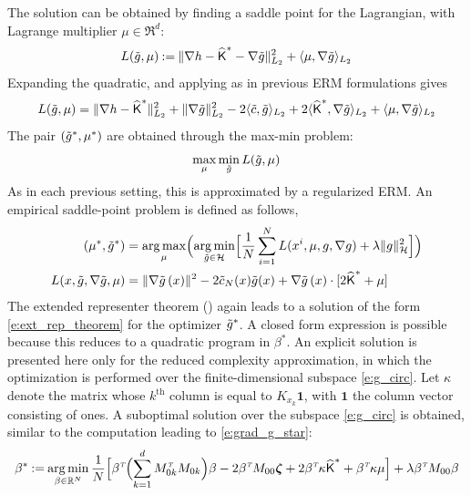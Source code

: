 The solution can be obtained by finding a saddle point for the Lagrangian,  with Lagrange multiplier $\mu  \in\Re^d$:
\begin{equation}
L(\tilg, \mu ) \eqdef   \| \nabla h - \hakFPF^* - \nabla \tilg \|^2_{L_2} +  \langle \mu ,  \nabla \tilg \rangle_{L_2}
\label{e:lag_dual}
\end{equation}
Expanding the quadratic, and applying  as in previous ERM formulations gives
\begin{equation}
L(\tilde g, \mu ) = \| \nabla h - \widehat{\text{\sf K}}^*\|_{L_2}^2 + \|\nabla \tilde g\|_{L_2}^2 - 2 \langle \tilde c, \tilde g \rangle_{L_2} + 2 \langle \widehat{\text{\sf K}}^*, \nabla \tilde g \rangle_{L_2} +  \langle \mu ,  \nabla \tilde g \rangle_{L_2}
\end{equation}
The pair $(\tilde g^*,\mu^*) $ are obtained through the max-min problem:
\begin{equation}
\max_\mu \min_{\tilde g}
L(\tilde g, \mu )
\end{equation}
As in each previous setting, this is approximated by a regularized ERM.
An empirical saddle-point problem is defined as follows,
\begin{equation}
\begin{aligned}
(\mu^* ,  \tilde g^*)  & =
\mathop{\rm arg{\,}max}_\mu  \Bigl(\mathop{\rm arg{\,}min}_{\tilde g \in {\cal H}} \Bigl[ \frac{1}{N} \sum_{i=1}^N  L(x^i,\mu, g,\nabla g) + \lambda \|g\|^2_{\cal H} \Bigr] \Bigr) \\
L(x,\tilde g,\nabla \tilde g, \mu)
&= \|\nabla \tilde g\, (x) \|^2    - 2   \tilde c_N(x)   \tilde g (x) +     \nabla \tilde g \, (x) \cdot [2 \widehat{\text{\sf K}}^*   + \mu]
\end{aligned}
\end{equation}
The extended representer theorem () again leads to a solution of the form \eqref{e:ext_rep_theorem} for the optimizer $ \tilde g^*$.
A closed form expression is possible because this reduces to a quadratic program in $\beta^*$. An explicit solution is presented here only for the reduced complexity approximation, in which the optimization is performed over the finite-dimensional subspace \eqref{e:g_circ}. Let $\kappa$ denote the matrix whose $k^{\text{th}}$ column is equal to $K_{x_k}\pmb{1}$,  with $\pmb{1}$ the column vector consisting of ones.   A suboptimal solution over the subspace \eqref{e:g_circ} is obtained, similar to the computation leading to   \eqref{e:grad_g_star}:
\begin{equation}
\beta ^* \mathbin{:=}
\mathop{\rm arg{\,}min}_{\beta  \in \mathbb{R}^N} \frac{1}{N} \Bigl[  \beta ^{\hbox{\tiny\it T}} \Bigl( \sum_{k=1}^d M_{0k}^{\hbox{\tiny\it T}} M_{0k} \Bigr) \beta   - 2 \beta ^{\hbox{\tiny\it T}}  M_{00} \boldsymbol{\zeta} + 2 \beta ^{\hbox{\tiny\it T}} \kappa \widehat{\text{\sf K}}^* + \beta ^{\hbox{\tiny\it T}} \kappa \mu  \Bigr]+ \lambda \beta ^{\hbox{\tiny\it T}}  M_{00} \beta
\end{equation}
